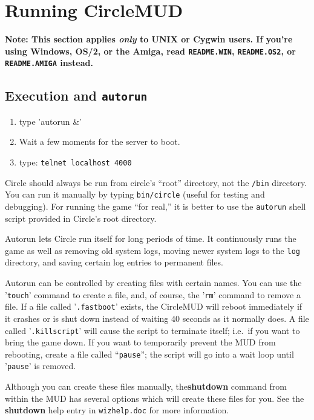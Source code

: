 \documentclass[11pt]{article}
\begin{document}
\section{Running CircleMUD}
{\bf Note: This section applies {\em only} to UNIX or Cygwin users.  If you're using Windows, OS/2, or the Amiga, read \texttt{README.WIN}, \texttt{README.OS2}, or \texttt{README.AMIGA} instead.}

\subsection{Execution and \texttt{autorun}}
\begin{enumerate}
\item type 'autorun \&'
\item Wait a few moments for the server to boot.
\item type: \texttt{telnet localhost 4000}
\end{enumerate}
\par
Circle should always be run from circle's ``root'' directory, not the \texttt{/bin} directory.  You can run it manually by typing \texttt{bin/circle} (useful for testing and debugging).  For running the game ``for real,'' it is better to use the \texttt{autorun} shell script provided in Circle's root  directory.
\par
Autorun lets Circle run itself for long periods of time.  It continuously runs the game as well as removing old system logs, moving newer system logs to the \texttt{log} directory, and saving certain log entries to permanent files. 
\par
Autorun can be controlled by creating files with certain names.  You can use the '\texttt{touch}' command to create a file, and, of course, the '\texttt{rm}' command to remove a file.  If a file called '\texttt{.fastboot}' exists, the CircleMUD will reboot immediately if it crashes or is shut down instead of waiting 40 seconds as it normally does.  A file called '\texttt{.killscript}' will cause the script to terminate itself; i.e.\ if you want to bring the game down.  If you want to temporarily prevent the MUD from rebooting, create a file called ``\texttt{pause}''; the script will go into a wait loop until '\texttt{pause}' is removed.
\par
Although you can create these files manually, the{\bf shutdown} command from within the MUD has several options which will create these files for you.  See the {\bf shutdown} help entry in \texttt{wizhelp.doc} for more information.
\end{document}
